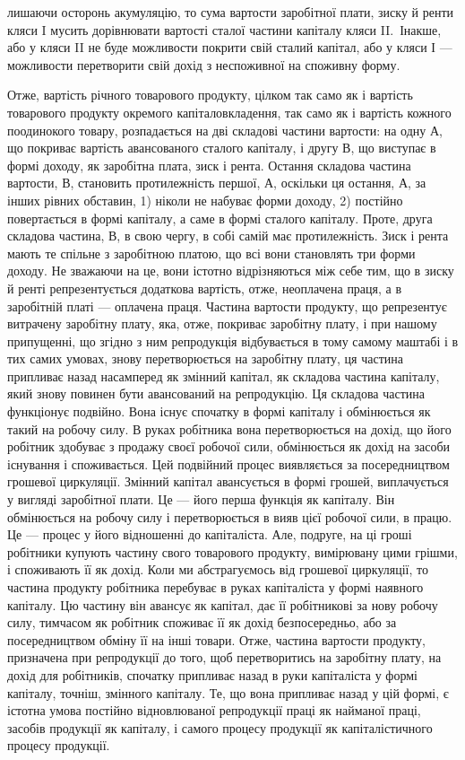 \parcont{}  %
лишаючи осторонь акумуляцію, то сума вартости заробітної плати, зиску й ренти
кляси I мусить дорівнювати вартості сталої частини капіталу кляси II.~Інакше,
або у кляси II не буде можливости покрити свій сталий капітал, або у кляси І —
можливости перетворити свій дохід з неспоживної на споживну форму.

Отже, вартість річного товарового продукту, цілком так само як і вартість
товарового продукту окремого капіталовкладення, так само як і вартість кожного
поодинокого товару, розпадається на дві складові частини вартости: на одну $А$, що
покриває вартість авансованого сталого капіталу, і другу $В$, що виступає в формі
доходу, як заробітна плата, зиск і рента. Остання складова частина вартости, $В$,
становить протилежність першої, $А$, оскільки ця остання, $А$, за інших рівних
обставин, 1) ніколи не набуває форми доходу, 2) постійно повертається в формі
капіталу, а саме в формі сталого капіталу. Проте, друга складова частина, $В$,
в свою чергу, в собі самій має протилежність. Зиск і рента мають те спільне з заробітною
платою, що всі вони становлять три форми доходу. Не зважаючи на це,
вони істотно відрізняються між себе тим, що в зиску й ренті репрезентується
додаткова вартість, отже, неоплачена праця, а в заробітній платі — оплачена
праця. Частина вартости продукту, що репрезентує витрачену заробітну плату,
яка, отже, покриває заробітну плату, і при нашому припущенні, що згідно з ним
репродукція відбувається в тому самому маштабі і в тих самих умовах, знову
перетворюється на заробітну плату, ця частина припливає назад насамперед
як змінний капітал, як складова частина капіталу, який знову повинен бути
авансований на репродукцію. Ця складова частина функціонує подвійно. Вона
існує спочатку в формі капіталу і обмінюється як такий на робочу силу. В руках
робітника вона перетворюється на дохід, що його робітник здобуває з продажу
своєї робочої сили, обмінюється як дохід на засоби існування і споживається.
Цей подвійний процес виявляється за посередництвом грошевої циркуляції. Змінний
капітал авансується в формі грошей, виплачується у вигляді заробітної плати.
Це — його перша функція як капіталу. Він обмінюється на робочу силу і перетворюється
в вияв цієї робочої сили, в працю. Це — процес у його відношенні до
капіталіста. Але, подруге, на ці гроші робітники купують частину свого товарового
продукту, вимірювану цими грішми, і споживають її як дохід. Коли ми
абстрагуємось від грошевої циркуляції, то частина продукту робітника перебуває
в руках капіталіста у формі наявного капіталу. Цю частину він авансує як
капітал, дає її робітникові за нову робочу силу, тимчасом як робітник споживає
її як дохід безпосередньо, або за посередництвом обміну її на інші товари.
Отже, частина вартости продукту, призначена при репродукції до того, щоб перетворитись
на заробітну плату, на дохід для робітників, спочатку припливає
назад в руки капіталіста у формі капіталу, точніш, змінного капіталу. Те, що
вона припливає назад у цій формі, є істотна умова постійно відновлюваної
репродукції праці як найманої праці, засобів продукції як капіталу, і самого
процесу продукції як капіталістичного процесу продукції.


